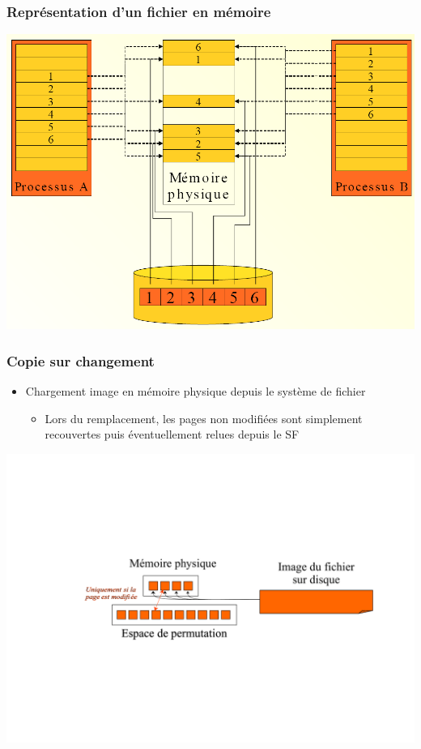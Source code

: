 \begin{frame}
\frametitle{Représentation d'un fichier en mémoire}
\includegraphics[width=.8\textwidth]{../illustration/repres_fichier_memoire.png}
\end{frame}

\begin{frame}
\frametitle{Copie sur changement}
\begin{itemize}
\item Chargement image en mémoire physique depuis le système de fichier
\begin{itemize}
\item Lors du remplacement, les pages non modifiées sont simplement recouvertes puis éventuellement relues depuis le SF
\end{itemize}
\end{itemize}
\includegraphics[width=\textwidth]{../illustration/mapping_copie_changement.pdf}
\end{frame}


